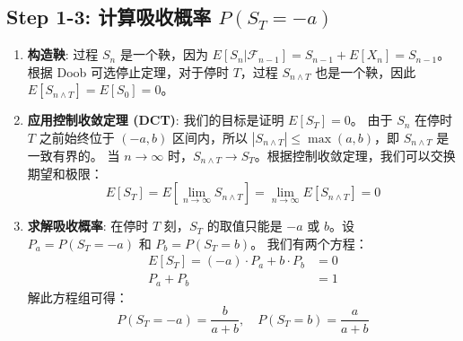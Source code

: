 \documentclass[12pt, a4paper, oneside, fontset=windows]{ctexbook}
\begin{document}
\subsection{Step 1-3: 计算吸收概率 $P(S_T=-a)$}
\begin{enumerate}
    \item \textbf{构造鞅}: 过程 $S_n$ 是一个鞅，因为 $E[S_n|\mathcal{F}_{n-1}] = S_{n-1} + E[X_n] = S_{n-1}$。
    根据 Doob 可选停止定理，对于停时 $T$，过程 $S_{n \wedge T}$ 也是一个鞅，因此 $E[S_{n \wedge T}] = E[S_0] = 0$。

    \item \textbf{应用控制收敛定理 (DCT)}: 我们的目标是证明 $E[S_T]=0$。
    由于 $S_n$ 在停时 $T$ 之前始终位于 $(-a, b)$ 区间内，所以 $|S_{n \wedge T}| \le \max(a,b)$，即 $S_{n \wedge T}$ 是一致有界的。
    当 $n \to \infty$ 时，$S_{n \wedge T} \to S_T$。根据控制收敛定理，我们可以交换期望和极限：
    \[ E[S_T] = E[\lim_{n \to \infty} S_{n \wedge T}] = \lim_{n \to \infty} E[S_{n \wedge T}] = 0 \]

    \item \textbf{求解吸收概率}: 在停时 $T$ 刻，$S_T$ 的取值只能是 $-a$ 或 $b$。设 $P_a = P(S_T=-a)$ 和 $P_b = P(S_T=b)$。
    我们有两个方程：
    \begin{align*}
        E[S_T] = (-a) \cdot P_a + b \cdot P_b &= 0 \\
        P_a + P_b &= 1
    \end{align*}
    解此方程组可得：
    \[ P(S_T=-a) = \frac{b}{a+b}, \quad P(S_T=b) = \frac{a}{a+b} \]
\end{enumerate}
\end{document}

